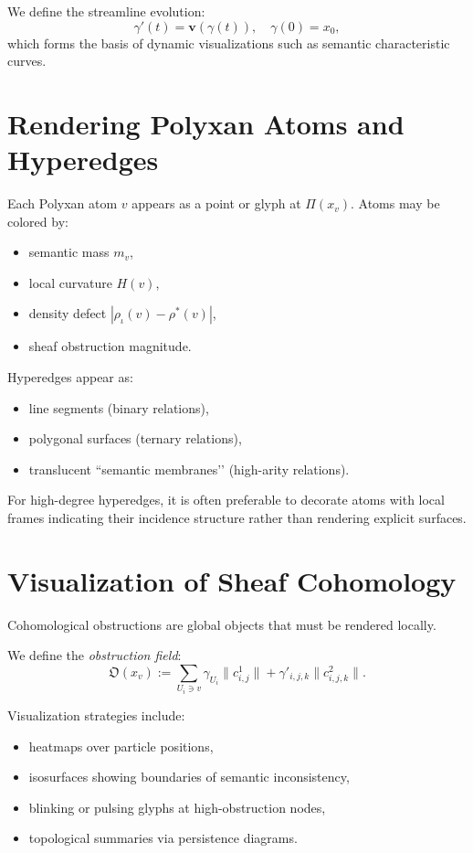 We define the streamline evolution:
\[
  \gamma'(t) = \mathbf{v}(\gamma(t)),\quad
  \gamma(0)=x_0,
\]
which forms the basis of dynamic visualizations
such as semantic characteristic curves.


\section{Rendering Polyxan Atoms and Hyperedges}

Each Polyxan atom $v$ appears as a point or glyph at $\Pi(x_v)$.
Atoms may be colored by:
\begin{itemize}
\item semantic mass $m_v$,
\item local curvature $H(v)$,
\item density defect $|\rho_\iota(v)-\rho^*(v)|$,
\item sheaf obstruction magnitude.
\end{itemize}

Hyperedges appear as:
\begin{itemize}
\item line segments (binary relations),
\item polygonal surfaces (ternary relations),
\item translucent “semantic membranes’’ (high-arity relations).
\end{itemize}

For high-degree hyperedges,
it is often preferable to decorate atoms with local frames indicating
their incidence structure rather than rendering explicit surfaces.


\section{Visualization of Sheaf Cohomology}

Cohomological obstructions are global objects that must be rendered locally.

We define the \emph{obstruction field}:
\[
  \mathfrak{O}(x_v)
    := \sum_{U_i\ni v}
       \gamma_{U_i}\|c^1_{i,j}\|
       + \gamma'_{i,j,k}\|c^2_{i,j,k}\|.
\]

Visualization strategies include:
\begin{itemize}
\item heatmaps over particle positions,
\item isosurfaces showing boundaries of semantic inconsistency,
\item blinking or pulsing glyphs at high-obstruction nodes,
\item topological summaries via persistence diagrams.
\end{itemize}

